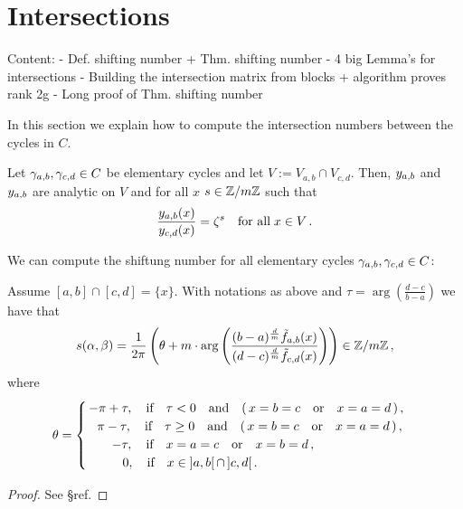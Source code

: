 \documentclass[main.tex]{subfiles}
\begin{document}
  \section{Intersections}\label{sec:intersections}

  Content: - Def. shifting number + Thm. shifting number
	   - 4 big Lemma's for intersections
	   - Building the intersection matrix from blocks + algorithm proves rank 2g
	   - Long proof of Thm. shifting number

	In this section we explain how to compute the intersection numbers between the cycles in $C$. 
	
	\begin{defn}\label{def:shift_numb}
	Let $\gamma_{a,b}, \gamma_{c,d} \in C$ be elementary cycles and let $V := V_{a,b} \cap V_{c,d}$. Then, $y_{a,b}$ and $y_{a,b}$ are analytic on $V$ and for all $x$
	$s \in \mathbb{Z}/m\mathbb{Z}$ such that
	\begin{align}
	 \frac{y_{a,b}(x)}{y_{c,d}(x)} = \zeta^s \quad \text{for all} \; x \in V\,.
	\end{align}
	\end{defn}

	 
	    We can compute the shiftung number for all elementary cycles $\gamma_{a,b}, \gamma_{c,d} \in C$:
    
    \begin{thm}\label{thm:shift_numb}
    Assume $[a,b] \cap [c,d] = \{x\}$. With notations as above and $\tau = \arg \left( \frac{d-c}{b-a} \right)$ we have that
     \begin{align}\label{eq:shift_numb}
       s(\alpha,\beta) = \frac{1}{2\pi} \left( \theta +  m \cdot \arg \left( \frac{(b-a)^{\frac{d}{m}} \tilde{f}_{a,b}(x)}{(d-c)^{\frac{d}{m}} \tilde{f}_{c,d}(x)} \right) \right) \in \mathbb{Z}/m\mathbb{Z}\,,
     \end{align}
     where
      \begin{align*}\theta = \begin{cases}
                              \, -\pi+\tau, \quad \text{if} \quad \tau < 0 \quad \text{and} \quad (\,x = b = c \quad \text{or} \quad x = a = d\,)\,,\\
                              \quad\! \pi-\tau, \quad \text{if} \quad \tau \ge 0 \quad \text{and} \quad (\,x = b = c \quad \text{or} \quad x = a = d\,)\,,\\
                              \hspace{0.7cm} -\tau, \quad \text{if} \quad x = a = c \quad \text{or} \quad x = b = d\,,\\
                              \hspace{1cm} 0, \quad \text{if} \quad x  \in \; ]a,b[ \,\cap\, ]c,d[\,.
                             \end{cases}
     \end{align*}
    \end{thm}
    \begin{proof}
     See \S \todo ref.
    \end{proof}
\end{document}
